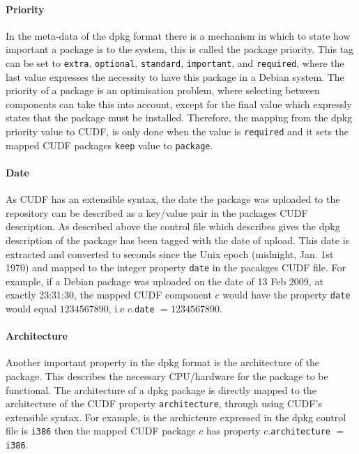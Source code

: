 \paragraph{Priority}
In the meta-data of the dpkg format there is a mechanism in which to state how important a package is to the system, this is called the package priority.
This tag can be set to \verb+extra+, \verb+optional+, \verb+standard+, \verb+important+, and \verb+required+, where the last value expresses the necessity to have this package in a Debian system.
The priority of a package is an optimisation problem, where selecting between components can take this into account, 
except for the final value which expressly states that the package must be installed.
Therefore, the mapping from the dpkg priority value to CUDF, is only done when the value is \verb+required+ and it sets the mapped CUDF packages \verb+keep+ value to \verb+package+.

\paragraph{Date}
As CUDF has an extensible syntax, the date the package was uploaded to the repository can be described as a key/value pair in the packages CUDF description.
As described above the control file which describes gives the dpkg description of the package has been tagged with the date of upload.
This date is extracted and converted to seconds since the Unix epoch (midnight, Jan. 1st 1970) and mapped to the integer property \verb+date+ in the pacakges CUDF file.
For example, if a Debian package was uploaded on the date of 13 Feb 2009, at exactly 23:31:30, 
the mapped CUDF component $c$ would have the property \verb+date+ would equal $1234567890$, i.e $c$.\verb+date+ $= 1234567890$.

\paragraph{Architecture}
Another important property in the dpkg format is the architecture of the package.
This describes the necessary CPU/hardware for the package to be functional.
The architecture of a dpkg package is directly mapped to the architecture of the CUDF property \verb+architecture+, through using CUDF's extensible syntax.
For example, is the archicteure expressed in the dpkg control file is \verb+i386+ then the mapped CUDF package $c$ has property $c$.\verb+architecture+ $=$ \verb+i386+.

